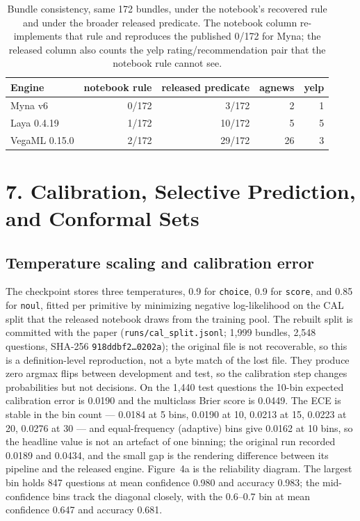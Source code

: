 \documentclass[11pt]{article}
\begin{document}
\begin{table}[t]
\centering
\footnotesize
\caption{Bundle consistency, same 172 bundles, under the notebook's recovered rule and under the
broader released predicate. The notebook column re-implements that rule and reproduces the
published 0/172 for Myna; the released column also counts the yelp rating/recommendation pair that
the notebook rule cannot see.}\begin{tabular}{lrrrr}
\toprule
Engine & notebook rule & released predicate & agnews & yelp \\
\midrule
Myna v6 & 0/172 & 3/172 & 2 & 1 \\
Laya 0.4.19 & 1/172 & 10/172 & 5 & 5 \\
VegaML 0.15.0 & 2/172 & 29/172 & 26 & 3 \\
\bottomrule
\end{tabular}
\end{table}

\section*{7. Calibration, Selective Prediction, and Conformal Sets}
\subsection{Temperature scaling and calibration error}
The checkpoint stores three temperatures, 0.9 for \texttt{choice}, 0.9 for \texttt{score}, and
0.85 for \texttt{noul}, fitted per primitive by minimizing negative log-likelihood on the CAL split
that the released notebook draws from the training pool. The rebuilt split is committed
with the paper (\texttt{runs/cal\_split.jsonl}; 1{,}999 bundles, 2{,}548 questions,
SHA-256 \texttt{918ddbf2\ldots0202a}); the original file is not recoverable, so
this is a definition-level reproduction, not a byte match of the lost file. They produce zero argmax flips between
development and test, so the calibration step changes probabilities but not decisions. On the
1{,}440 test questions the 10-bin expected calibration error is 0.0190 and the multiclass Brier
score is 0.0449. The ECE is stable in the bin count --- 0.0184 at 5 bins, 0.0190 at 10, 0.0213 at
15, 0.0223 at 20, 0.0276 at 30 --- and equal-frequency (adaptive) bins give 0.0162 at 10 bins, so
the headline value is not an artefact of one binning; the original run recorded 0.0189 and 0.0434, and the small gap is the rendering
difference between its pipeline and the released engine. Figure~4a is the
reliability diagram. The largest bin holds 847 questions at mean confidence 0.980 and accuracy
0.983; the mid-confidence bins track the diagonal closely, with the 0.6--0.7 bin at mean
confidence 0.647 and accuracy 0.681.
\end{document}
